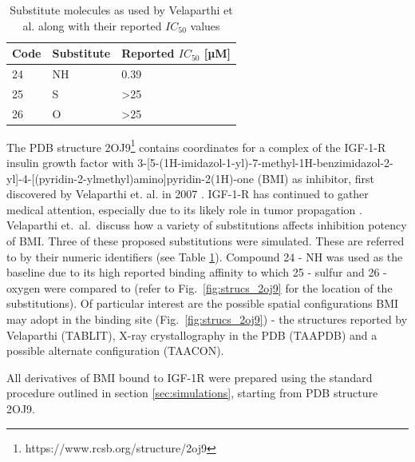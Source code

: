 \documentclass[oneside]{scrreprt}
\begin{document}
\begin{table}[]
\centering
\begin{tabular}{|l|l|l|}
\hline
\textbf{Code} & \textbf{Substitute} & \textbf{Reported $IC_{50}$ {[}µM{]}} \\ \hline
24            & NH                  & 0.39                               \\ \hline
25            & S                   & \textgreater{}25                   \\ \hline
26            & O                   & \textgreater{}25                   \\ \hline
\end{tabular}%

\caption{Substitute molecules as used by Velaparthi et al. along with their reported $IC_{50}$ values \cite{velaparthi_discovery_2007}}
\label{tab:2oj9-substitutes}
\end{table}

\begin{sloppypar}
The PDB structure 2OJ9\footnote{https://www.rcsb.org/structure/2oj9} contains coordinates for a complex of the IGF-1-R insulin growth factor with 3-[5-(1H-imidazol-1-yl)-7-methyl-1H-benzimidazol-2-yl]-4-[(pyridin-2-ylmethyl)amino]pyridin-2(1H)-one (BMI) as inhibitor, first discovered by Velaparthi et. al. in 2007 \cite{velaparthi_discovery_2007}. IGF-1-R has continued to gather medical attention, especially due to its likely role in tumor propagation \cite{chiu_disruption_2018}. Velaparthi et.\ al.\ discuss how a variety of substitutions affects inhibition potency of BMI. Three of these proposed substitutions were simulated. These are referred to by their numeric identifiers (see Table \ref{tab:2oj9-substitutes}). Compound 24 - NH was used as the baseline  due to its high reported binding affinity to which 25 - sulfur and 26 - oxygen were compared to (refer to Fig.~\ref{fig:strucs_2oj9} for the location of the substitutions). Of particular interest are the possible spatial configurations BMI may adopt in the binding site (Fig.~\ref{fig:strucs_2oj9}) - the structures reported by Velaparthi \cite{velaparthi_discovery_2007} (TABLIT), X-ray crystallography in the PDB (TAAPDB) and a possible alternate configuration (TAACON).
\end{sloppypar}

All derivatives of BMI bound to IGF-1R were prepared using the standard procedure outlined in section \ref{sec:simulations}, starting from PDB structure 2OJ9.
\end{document}
